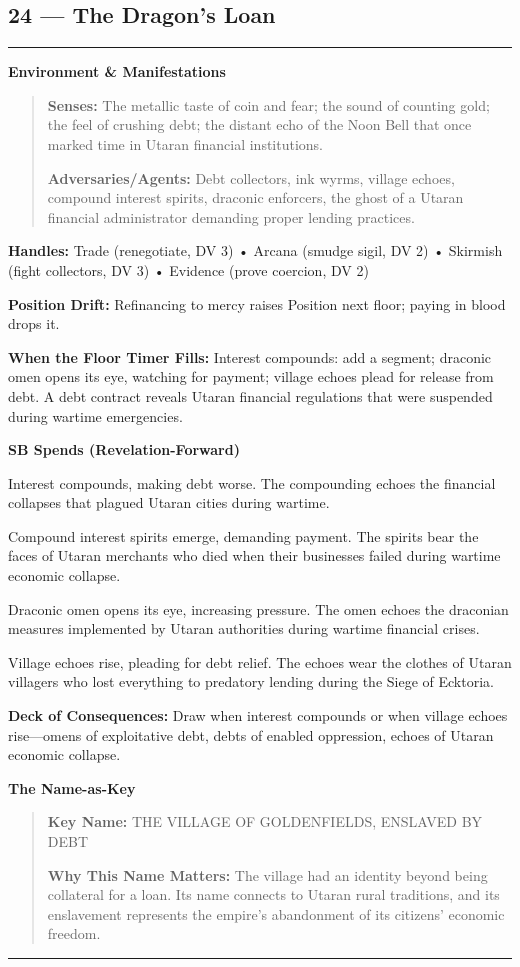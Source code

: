 \documentclass[18pt, letterpaper, twoside]{article}
\newenvironment{floorbox}[1]{%
    \begin{center}
    \begin{minipage}{0.95\textwidth}
    \subsection*{#1}
    \vspace{-0.5em}
    \rule{\textwidth}{0.5pt}
    \vspace{0.5em}
}{%
    \vspace{0.5em}
    \rule{\textwidth}{0.5pt}
    \end{minipage}
    \end{center}
}
\newenvironment{gmnote}[1]{%
    \vspace{0.5em}
    \noindent\textbf{#1}
    \begin{quote}
}{%
    \end{quote}
    \vspace{0.5em}
}
\newcommand{\handles}[1]{\noindent\textbf{Handles:} #1\par}
\newcommand{\sbitem}[2]{\item[#1 SB:] #2}
\newcommand{\deckdraw}[1]{\noindent\textbf{Deck of Consequences:} #1\par}
\newcommand{\keyname}[1]{\noindent\textbf{Key Name:} #1\par}
\newcommand{\nameimportance}[1]{\noindent\textbf{Why This Name Matters:} #1\par}
\begin{document}
\begin{floorbox}{24 --- The Dragon's Loan}
\begin{gmnote}{Environment \& Manifestations}
\textbf{Senses:} The metallic taste of coin and fear; the sound of counting gold; the feel of crushing debt; the distant echo of the Noon Bell that once marked time in Utaran financial institutions.

\textbf{Adversaries/Agents:} Debt collectors, ink wyrms, village echoes, compound interest spirits, draconic enforcers, the ghost of a Utaran financial administrator demanding proper lending practices.
\end{gmnote}

\handles{Trade (renegotiate, DV 3) • Arcana (smudge sigil, DV 2) • Skirmish (fight collectors, DV 3) • Evidence (prove coercion, DV 2)}

\textbf{Position Drift:} Refinancing to mercy raises Position next floor; paying in blood drops it.

\textbf{When the Floor Timer Fills:} Interest compounds: add a segment; draconic omen opens its eye, watching for payment; village echoes plead for release from debt. A debt contract reveals Utaran financial regulations that were suspended during wartime emergencies.

\textbf{SB Spends (Revelation-Forward)}
\begin{description}[leftmargin=*, style=unboxed]
    \sbitem{1}{Interest compounds, making debt worse. The compounding echoes the financial collapses that plagued Utaran cities during wartime.}
    \sbitem{2}{Compound interest spirits emerge, demanding payment. The spirits bear the faces of Utaran merchants who died when their businesses failed during wartime economic collapse.}
    \sbitem{3}{Draconic omen opens its eye, increasing pressure. The omen echoes the draconian measures implemented by Utaran authorities during wartime financial crises.}
    \sbitem{4+}{Village echoes rise, pleading for debt relief. The echoes wear the clothes of Utaran villagers who lost everything to predatory lending during the Siege of Ecktoria.}
\end{description}

\deckdraw{Draw when interest compounds or when village echoes rise---omens of exploitative debt, debts of enabled oppression, echoes of Utaran economic collapse.}

\begin{gmnote}{The Name-as-Key}
\keyname{THE VILLAGE OF GOLDENFIELDS, ENSLAVED BY DEBT}
\nameimportance{The village had an identity beyond being collateral for a loan. Its name connects to Utaran rural traditions, and its enslavement represents the empire's abandonment of its citizens' economic freedom.}


\end{gmnote}
\end{floorbox}
\end{document}
